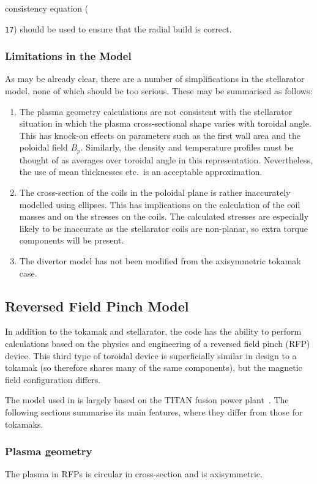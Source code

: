 consistency equation ({\texttt{17}) should be used to ensure that the radial
build is correct.

\subsubsection{Limitations in the Model}
As may be already clear, there are a number of simplifications in the
stellarator model, none of which should be too serious. These may be
summarised as follows:
\begin{enumerate}
\item The plasma geometry calculations are not consistent with the
stellarator situation in which the plasma cross-sectional shape varies with
toroidal angle. This has knock-on effects on parameters such as the first wall
area and the poloidal field $B_p$. Similarly, the density and temperature
profiles must be thought of as averages over toroidal angle in this
representation. Nevertheless, the use of mean thicknesses etc.\ is an
acceptable approximation.
\item The cross-section of the coils in the poloidal plane is rather
inaccurately modelled using ellipses. This has implications on the calculation
of the coil masses and on the stresses on the coils. The calculated stresses
are especially likely to be inaccurate as the stellarator coils are
non-planar, so extra torque components will be present.
\item The divertor model has not been modified from the axisymmetric tokamak
case.
\end{enumerate}

\subsection{Reversed Field Pinch Model}
In addition to the tokamak and stellarator, the code has the ability to
perform calculations based on the physics and engineering of a reversed field
pinch (RFP) device. This third type of toroidal device is superficially
similar in design to a tokamak (so therefore shares many of the same
components), but the magnetic field configuration differs.

The model used in \PS is largely based on the TITAN fusion power
plant~\cite{titan1,titan2}. The following sections summarise its main
features, where they differ from those for tokamaks.

\subsubsection{Plasma geometry}
The plasma in RFPs is circular in cross-section and is axisymmetric.

}

